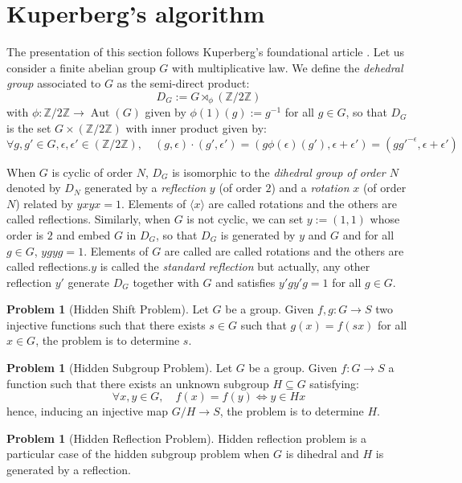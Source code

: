 \documentclass[a4paper,10pt]{report}
\theoremstyle{definition}
\theoremstyle{plain}
\theoremstyle{definition}
\newtheorem{problem}[definition]{Problem}
\newcommand{\Z}{\mathbb{Z}}
\renewcommand{\(}{\left(}
\renewcommand{\)}{\right)}
\DeclareMathOperator{\Aut}{Aut}
\begin{document}
\section{Kuperberg's algorithm}\label{paragraph 14}

The presentation of this section follows Kuperberg's foundational article \cite{Kuperberg}. Let us consider a finite abelian group $G$ with multiplicative law. We define the \emph{dehedral group} associated to $G$ as the semi-direct product:
\[D_G:=G\rtimes_\phi (\Z/2\Z)\]
with $\phi: \Z/2\Z\longrightarrow \Aut(G)$ given by $\phi(1)(g):=g^{-1}$ for all $g\in G$, so that $D_G$ is the set $G\times(\Z/2\Z)$ with inner product given by:
\[\forall g,g'\in G, \epsilon,\epsilon'\in(\Z/2\Z), \quad (g,\epsilon)\cdot(g',\epsilon')=(g\phi(\epsilon)(g'),\epsilon+\epsilon')=(gg'^{-\epsilon},\epsilon+\epsilon')\]

When $G$ is cyclic of order $N$, $D_G$ is isomorphic to the \emph{dihedral group of order $N$} denoted by $D_N$ generated by a \emph{reflection} $y$ (of order $2$) and a \emph{rotation} $x$ (of order $N$) related by $yxyx=1$.  Elements of $\langle x\rangle$ are called rotations and the others are called reflections. Similarly, when $G$ is not cyclic, we can set $y:=(1,1)$ whose order is $2$ and embed $G$ in $D_G$, so that $D_G$ is generated by $y$ and $G$ and for all $g\in G$, $ygyg=1$. Elements of $G$ are called are called rotations and the others are called reflections.$y$ is called the \emph{standard reflection} but actually, any other reflection $y'$ generate $D_G$ together with $G$ and satisfies $y'gy'g=1$ for all $g\in G$. 

\begin{problem}[Hidden Shift Problem]
Let $G$ be a group. Given $f,g: G\longrightarrow S$ two injective functions such that there exists $s\in G$ such that $g(x)=f(sx)$ for all $x\in G$, the problem is to determine $s$.
\end{problem}

\begin{problem}[Hidden Subgroup Problem]
Let $G$ be a group. Given $f: G\longrightarrow S$ a function such that there exists an unknown subgroup $H\subseteq G$ satisfying:
\[\forall x,y\in G, \quad f(x)=f(y)\Longleftrightarrow y\in Hx\]
hence, inducing an injective map $G/H\longrightarrow S$, the problem is to determine $H$.
\end{problem}

\begin{problem}[Hidden Reflection Problem]
Hidden reflection problem is a particular case of the hidden subgroup problem when $G$ is dihedral and $H$ is generated by a reflection.
\end{problem}
\end{document}
